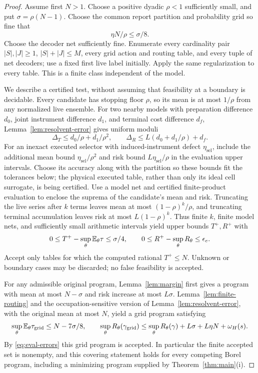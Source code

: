 \begin{proof}
Assume first $N>1$. Choose a positive dyadic $\rho<1$ sufficiently small, and put $\sigma=\rho(N-1)$. Choose the common report partition and probability grid so fine that
\begin{equation}\label{eq:reserve-choice}
 \eta N/\rho\le\sigma/8.
\end{equation}
Choose the decoder net sufficiently fine. Enumerate every cardinality pair $|S|,|J|\ge1$, $|S|+|J|\le M$, every grid action and routing table, and every tuple of net decoders; use a fixed first live label initially. Apply the same regularization to every table. This is a finite class independent of the model.

We describe a certified test, without assuming that feasibility at a boundary is decidable. Every candidate has stopping floor $\rho$, so its mean is at most $1/\rho$ from any normalized live ensemble. For two nearby models with preparation difference $d_0$, joint instrument difference $d_1$, and terminal cost difference $d_f$, Lemma~\ref{lem:resolvent-error} gives uniform moduli
\begin{equation}\label{eq:evaluation-moduli}
 \Delta_T\le d_0/\rho+d_1/\rho^2,
 \qquad \Delta_R\le L(d_0+d_1/\rho)+d_f.
\end{equation}
For an inexact executed selector with induced-instrument defect $\eta_{\mathrm{sel}}$, include the additional mean bound $\eta_{\mathrm{sel}}/\rho^2$ and risk bound $L\eta_{\mathrm{sel}}/\rho$ in the evaluation upper intervals. Choose its accuracy along with the partition so these bounds fit the tolerances below; the physical executed table, rather than only its ideal cell surrogate, is being certified. Use a model net and certified finite-product evaluation to enclose the suprema of the candidate's mean and risk. Truncating the live series after $k$ terms leaves mean at most $(1-\rho)^k/\rho$, and truncating terminal accumulation leaves risk at most $L(1-\rho)^k$. Thus finite $k$, finite model nets, and sufficiently small arithmetic intervals yield upper bounds $T^+,R^+$ with
\begin{equation}\label{eq:eval-errors}
 0\le T^+-\sup_\theta\mathbb E_\theta\tau\le\sigma/4,
 \qquad 0\le R^+-\sup_\theta R_\theta\le\epsilon_e.
\end{equation}
Accept only tables for which the computed rational $T^+\le N$. Unknown or boundary cases may be discarded; no false feasibility is accepted.

For any admissible original program, Lemma~\ref{lem:margin} first gives a program with mean at most $N-\sigma$ and risk increase at most $L\sigma$. Lemma~\ref{lem:finite-routing} and the occupation-sensitive version of Lemma~\ref{lem:resolvent-error}, with the original mean at most $N$, yield a grid program satisfying
\[
 \sup_\theta\mathbb E_\theta\tau_{\mathrm{grid}}\le N-7\sigma/8,
 \qquad \sup_\theta R_\theta(\gamma_{\mathrm{grid}})
       \le\sup_\theta R_\theta(\gamma)+L\sigma+L\eta N+\omega_H(s).
\]
By \eqref{eq:eval-errors} this grid program is accepted. In particular the finite accepted set is nonempty, and this covering statement holds for every competing Borel program, including a minimizing program supplied by Theorem~\ref{thm:main}(i).


\end{proof}
